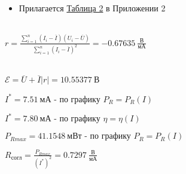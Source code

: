 \begin{itemize}
    \item Прилагается \hyperlink{table2}{Таблица 2} в Приложении 2
\end{itemize}

 \\
    
    $r = \frac{\sum\limits_{i=1}^{n}(I_i - \overline{I})(U_i - \overline{U})}{\sum\limits_{i=1}^{n}(I_i - \overline{I})^2} = -0.67635 \ \frac{\text{В}}{\text{мА}}$

    \smallvspace

     \\
    
    $\mathcal{E} = \overline{U} + \overline{I}|r| = 10.55377 \ \text{В}$

    \newpage


    $I^* = 7.51 \ \text{мА  - по графику } P_R = P_R(I)$

    $I^* = 7.80 \ \text{мА  - по графику } \eta = \eta(I)$

    \smallvspace


    $P_{R max} = 41.1548 \ \text{мВт - по графику } P_R = P_R(I)$

    \smallvspace


    $R_{\text{согл}} = \frac{P_{R max}}{(I^*)^2} = 0.7297 \ \frac{\text{В}}{\text{мА}}$